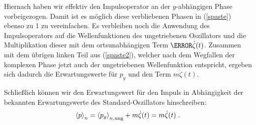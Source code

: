     Hiernach haben wir effektiv den Impulsoperator an der $y$-abhängigen Phase vorbeigezogen.
    Damit ist es möglich diese verbliebenen Phasen in (\ref{spaste}) ebenso zu 1 zu vereinfachen.
    Es verbleiben noch die Anwendung des Impulsoperators auf die Wellenfunktionen des ungetriebenen Oszillators und die Multiplikation dieser mit dem ortsunabhängigen Term $\m\dot \zeta(t)$.
    Zusammen mit dem übrigen linken Teil aus (\ref{spaste2}), welcher nach dem Wegfallen der komplexen Phase jetzt auch der ungetriebenen Wellenfunktion entspricht, ergeben sich dadurch die Erwartungswerte für $p_y$ und den Term $m\dot{\zeta}(t)$.

    Schließlich können wir den Erwartungswert für den Impuls in Abhängigkeit der bekannten Erwartungswerte des Standard-Oszillators hinschreiben:
    \begin{align}
      \braket{p}_n = \braket{p_y}_{n,\text{ung}} + m\dot{\zeta}(t) = m\dot{\zeta}(t) \; .
      \label{erwartungswert_p_einzelner}
    \end{align}

